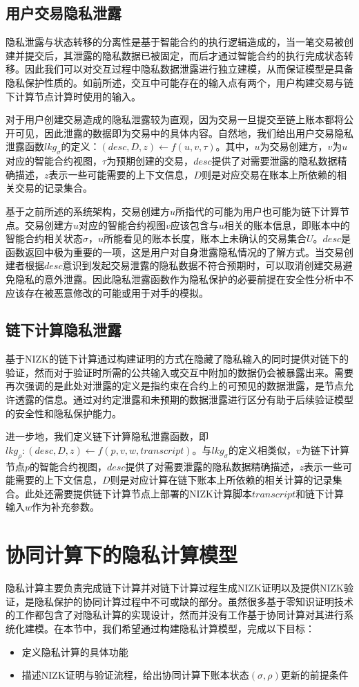 \subsection{用户交易隐私泄露}
隐私泄露与状态转移的分离性是基于智能合约的执行逻辑造成的，当一笔交易被创建并提交后，其泄露的隐私数据已被固定，而后才通过智能合约的执行完成状态转移。因此我们可以对交互过程中隐私数据泄露进行独立建模，从而保证模型是具备隐私保护性质的。如前所述，交互中可能存在的输入点有两个，用户构建交易与链下计算节点计算时使用的输入。

对于用户创建交易造成的隐私泄露较为直观，因为交易一旦提交至链上账本都将公开可见，因此泄露的数据即为交易中的具体内容。自然地，我们给出用户交易隐私泄露函数${lkg}_\sigma$的定义：$(desc, D, z) \leftarrow f(u, v, \tau)$。其中，$u$为交易创建方，$v$为$u$对应的智能合约视图，$\tau$为预期创建的交易，$desc$提供了对需要泄露的隐私数据精确描述，$z$表示一些可能需要的上下文信息，$D$则是对应交易在账本上所依赖的相关交易的记录集合。

基于之前所述的系统架构，交易创建方$u$所指代的可能为用户也可能为链下计算节点。交易创建方$u$对应的智能合约视图$v$应该包含与$u$相关的账本信息，即账本中的智能合约相关状态$\sigma$，$u$所能看见的账本长度，账本上未确认的交易集合$U$。$desc$是函数返回中极为重要的一项，这是用户对自身泄露隐私情况的了解方式。当交易创建者根据$desc$意识到发起交易泄露的隐私数据不符合预期时，可以取消创建交易避免隐私的意外泄露。因此隐私泄露函数作为隐私保护的必要前提在安全性分析中不应该存在被恶意修改的可能或用于对手的模拟。
\subsection{链下计算隐私泄露}
基于NIZK的链下计算通过构建证明的方式在隐藏了隐私输入的同时提供对链下的验证，然而对于验证时所需的公共输入或交互中附加的数据仍会被暴露出来。需要再次强调的是此处对泄露的定义是指约束在合约上的可预见的数据泄露，是节点允许透露的信息。通过对约定泄露和未预期的数据泄露进行区分有助于后续验证模型的安全性和隐私保护能力。

进一步地，我们定义链下计算隐私泄露函数，即${lkg}_\rho:(desc, D, z) \leftarrow f(p, v, w, transcript)$。与${lkg}_\sigma$的定义相类似，$v$为链下计算节点$p$的智能合约视图，$desc$提供了对需要泄露的隐私数据精确描述，$z$表示一些可能需要的上下文信息，$D$则是对应计算在链下账本上所依赖的相关计算的记录集合。此处还需要提供链下计算节点上部署的NIZK计算脚本$transcript$和链下计算输入$w$作为补充参数。

\section{协同计算下的隐私计算模型}
隐私计算主要负责完成链下计算并对链下计算过程生成NIZK证明以及提供NIZK验证，是隐私保护的协同计算过程中不可或缺的部分。虽然很多基于零知识证明技术的工作都包含了对隐私计算的实现设计，然而并没有工作基于协同计算对其进行系统化建模。在本节中，我们希望通过构建隐私计算模型，完成以下目标：
\begin{itemize}
    \setlength{\itemsep}{0pt}
    \setlength{\parsep}{0pt}
    \setlength{\parskip}{0pt}
    \item 定义隐私计算的具体功能
    \item 描述NIZK证明与验证流程，给出协同计算下账本状态$(\sigma, \rho)$更新的前提条件
\end{itemize}
